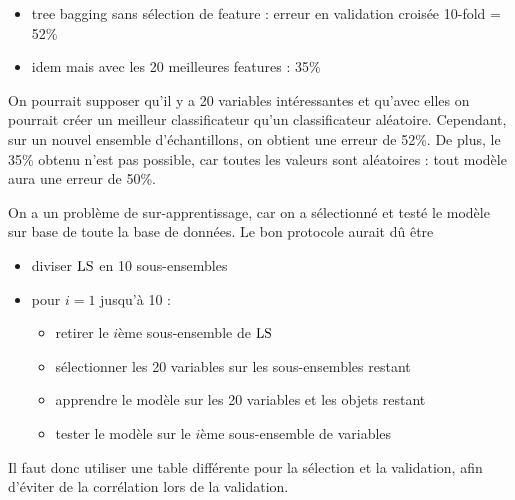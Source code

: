 \begin{itemize}
	\item tree bagging sans sélection de feature : erreur en validation croisée 10-fold = 52\%
	\item idem mais avec les 20 meilleures features : 35\%
\end{itemize}

On pourrait supposer qu'il y a 20 variables intéressantes et qu'avec elles on pourrait créer un meilleur classificateur qu'un classificateur aléatoire. Cependant, sur un nouvel ensemble d'échantillons, on obtient une erreur de 52\%. De plus, le 35\% obtenu n'est pas possible, car toutes les valeurs sont aléatoires : tout modèle aura une erreur de 50\%.

On a un problème de sur-apprentissage, car on a sélectionné et testé le modèle sur base de toute la base de données. Le bon protocole aurait dû être

\begin{itemize}
	\item diviser $\text{LS}$ en 10 sous-ensembles
	\item pour $i = 1$ jusqu'à 10 :
	
	\begin{itemize}
		\item retirer le $i$ème sous-ensemble de $\text{LS}$
		\item sélectionner les 20 variables sur les sous-ensembles restant
		\item apprendre le modèle sur les 20 variables et les objets restant
		\item tester le modèle sur le $i$ème sous-ensemble de variables
	\end{itemize}
\end{itemize}

Il faut donc utiliser une table différente pour la sélection et la validation, afin d'éviter de la corrélation lors de la validation.